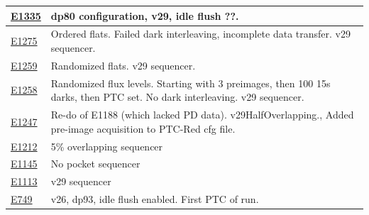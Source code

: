 \begin{longtable}{|p{5.0cm}|p{8.5cm}|}
\href{https://s3df.slac.stanford.edu/data/rubin/lsstcam/E1335/w_2024_35/}{E1335} & dp80 configuration, v29, idle flush ??. \\ \hline
\href{https://s3df.slac.stanford.edu/data/rubin/lsstcam/E1275/w_2024_35/}{E1275} & Ordered flats. Failed dark interleaving, incomplete data transfer. v29 sequencer. \\ \hline
\href{https://s3df.slac.stanford.edu/data/rubin/lsstcam/E1259/w_2024_35/}{E1259} & Randomized flats. v29 sequencer. \\ \hline
\href{https://s3df.slac.stanford.edu/data/rubin/lsstcam/E1258/w_2024_35/}{E1258} & Randomized flux levels. Starting with 3 preimages, then 100 15s darks, then PTC set. No dark interleaving. v29 sequencer. \\ \hline
\href{https://s3df.slac.stanford.edu/data/rubin/lsstcam/E1247/w_2024_35/}{E1247} & Re-do of E1188 (which lacked PD data). v29HalfOverlapping., Added pre-image acquisition to PTC-Red cfg file. \\ \hline
\href{https://s3df.slac.stanford.edu/data/rubin/lsstcam/E1212/w_2024_35/}{E1212} & 5\% overlapping sequencer \\ \hline
\href{https://s3df.slac.stanford.edu/data/rubin/lsstcam/E1145/w_2024_35/}{E1145} & No pocket sequencer \\ \hline
\href{https://s3df.slac.stanford.edu/data/rubin/lsstcam/E1113/w_2024_35/}{E1113} & v29 sequencer \\ \hline
\href{https://s3df.slac.stanford.edu/data/rubin/lsstcam/E749/w_2024_35/}{E749} & v26, dp93, idle flush enabled. First PTC of run. \\ \hline

\end{longtable}

